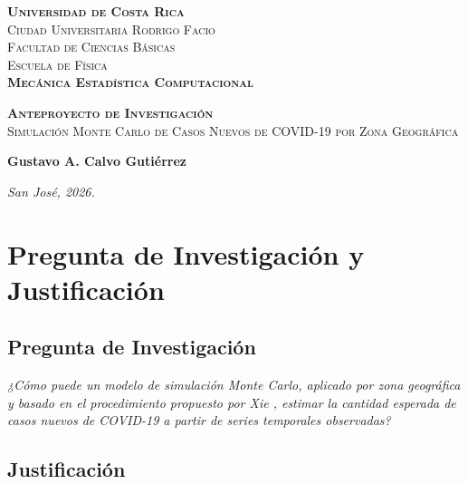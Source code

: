 \documentclass[12pt]{article}
\newcommand{\institucion}{Universidad de Costa Rica}
\newcommand{\campus}{Ciudad Universitaria Rodrigo Facio}
\newcommand{\facultad}{Facultad de Ciencias Básicas}
\newcommand{\escuela}{Escuela de Física}
\newcommand{\curso}{Mecánica Estadística Computacional}
\newcommand{\tituloanteproyecto}{Anteproyecto de Investigación}
\newcommand{\titulo}{Simulación Monte Carlo de Casos Nuevos de COVID-19 por Zona Geográfica}
\newcommand{\autor}{Gustavo A. Calvo Gutiérrez}
\newcommand{\lugarfecha}{San José, 2026.}
\begin{document}
\begin{titlepage}
  \begin{center}
    \LARGE \textbf{\textsc{\institucion}}
    \Large
    \\[1cm]
    \textsc{\campus}
    \\[0.1cm]
    \textsc{\facultad}
    \\[0.1cm]
    \textsc{\escuela} \\
    \vspace*{20 mm}
    \LARGE{\textsc{\textbf{\curso}}}
  \end{center}

  \vspace{2cm}

  \hrulefill
  \begin{center}
    \large \textbf{\textsc{\tituloanteproyecto}}
    \\[0.5cm]
    \textsc{\titulo}
  \end{center}
  \hrulefill

  \vfill

  \begin{center}
    \large \textbf{\autor}
  \end{center}

  \vspace{1cm}

  \begin{center}
    \textit{\lugarfecha}
  \end{center}
\end{titlepage}

\section{Pregunta de Investigación y Justificación}

\subsection{Pregunta de Investigación}

\noindent
\textit{
  ¿Cómo puede un modelo de simulación Monte Carlo, aplicado por zona
  geográfica y basado en el procedimiento propuesto por Xie \cite{Xie2020},
  estimar la cantidad esperada de casos nuevos de COVID-19 a partir de series
  temporales observadas?
}

\subsection{Justificación}
\end{document}
